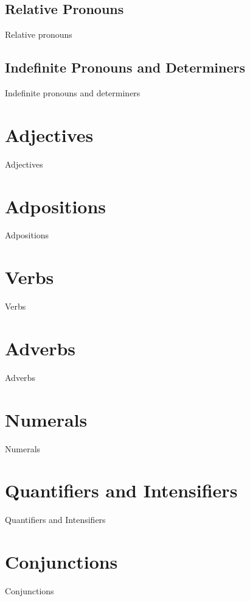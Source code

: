 \subsection{Relative Pronouns}
\label{subsec:tvk-relative-pronouns}

Relative pronouns

\subsection{Indefinite Pronouns and Determiners}
\label{subsec:tvk-indefinite-pronouns-determiners}

Indefinite pronouns and determiners

\section{Adjectives}
\label{sec:tvk-adjectives}

Adjectives

\section{Adpositions}
\label{sec:tvk-adpositions}

Adpositions

\section{Verbs}
\label{sec:tvk-verbs}

Verbs

\section{Adverbs}
\label{sec:tvk-adverbs}

Adverbs

\section{Numerals}
\label{sec:tvk-numerals}

Numerals

\section{Quantifiers and Intensifiers}
\label{sec:tvk-quant-intens}

Quantifiers and Intensifiers

\section{Conjunctions}
\label{sec:tvk-conjunctions}

Conjunctions
